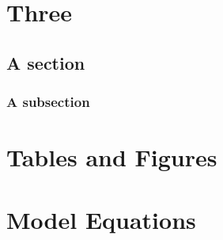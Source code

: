 \chapter{Three}
\section{A section}
\lipsum \cite{Chomsky1986,Chomsky1995}
\subsection{A subsection}
\lipsum[2]




\begin{appendices}
  \chapter{Tables and Figures}
  \lipsum[1]
  \chapter{Model Equations}
\lipsum[2]
\end{appendices}
